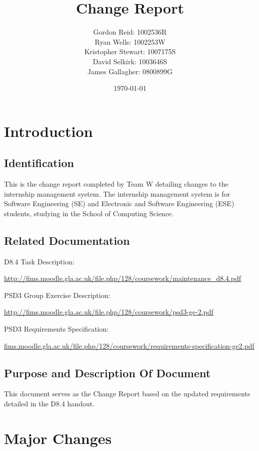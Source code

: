 \documentclass[11pt]{l3deliverable}
\title{Change Report}
\author{
    Gordon Reid: 1002536R\\
    Ryan Wells: 1002253W\\
    Kristopher Stewart: 1007175S\\
    David Selkirk: 1003646S\\
    James Gallagher: 0800899G\\
}
\date{\today}
\begin{document}
\maketitle

\newpage

\tableofcontents

\newpage

\section{Introduction}

\subsection{Identification}

This is the change report completed by Team W detailing changes to the 
internship management system. The internship management system is for 
Software Engineering (SE) and Electronic and Software Engineering (ESE) 
students, studying in the School of Computing Science.

\subsection{Related Documentation}

D8.4 Task Description:

\url{http://fims.moodle.gla.ac.uk/file.php/128/coursework/maintenance_d8.4.pdf}

PSD3 Group Exercise Description:

\url{http://fims.moodle.gla.ac.uk/file.php/128/coursework/psd3-ge-2.pdf}

PSD3 Requirements Specification:

\url{fims.moodle.gla.ac.uk/file.php/128/coursework/requirements-specification-ge2.pdf}

\subsection{Purpose and Description Of Document}

This document serves as the Change Report based on the updated requirements
detailed in the D8.4 handout. 

\newpage

\section{Major Changes}
\end{document}
